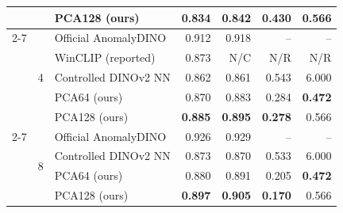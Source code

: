 \begin{table}[pos=t]
\begin{tabular}{ll lrrrr}
& & PCA128 (ours) & \textbf{0.834} & \textbf{0.842} & 0.430 & 0.566 \\
\cmidrule(lr){2-7}
& \multirow{5}{*}{4} & Official AnomalyDINO & 0.912 & 0.918 & -- & -- \\
& & WinCLIP (reported) & 0.873 & N/C & N/R & N/R \\
& & Controlled DINOv2 NN & 0.862 & 0.861 & 0.543 & 6.000 \\
& & PCA64 (ours) & 0.870 & 0.883 & 0.284 & \textbf{0.472} \\
& & PCA128 (ours) & \textbf{0.885} & \textbf{0.895} & \textbf{0.278} & 0.566 \\
\cmidrule(lr){2-7}
& \multirow{4}{*}{8} & Official AnomalyDINO & 0.926 & 0.929 & -- & -- \\
& & Controlled DINOv2 NN & 0.873 & 0.870 & 0.533 & 6.000 \\
& & PCA64 (ours) & 0.880 & 0.891 & 0.205 & \textbf{0.472} \\
& & PCA128 (ours) & \textbf{0.897} & \textbf{0.905} & \textbf{0.170} & 0.566 \\
\bottomrule
\end{tabular}
\end{table}
